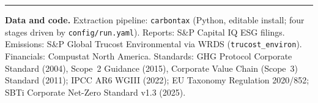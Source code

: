 \documentclass[11pt]{article}
\newcommand{\code}[1]{\texttt{\small #1}}
\begin{document}
\vspace{1em}
\begin{center}
\rule{0.4\textwidth}{0.4pt}
\end{center}
\small
\noindent\textbf{Data and code.} Extraction pipeline: \code{carbontax}
(Python, editable install; four stages driven by \code{config/run.yaml}).
Reports: S\&P Capital IQ ESG filings. Emissions: S\&P Global Trucost
Environmental via WRDS (\code{trucost\_environ}). Financials: Compustat
North America. Standards: GHG Protocol Corporate Standard (2004), Scope~2
Guidance (2015), Corporate Value Chain (Scope~3) Standard (2011); IPCC AR6
WGIII (2022); EU Taxonomy Regulation 2020/852; SBTi Corporate Net-Zero
Standard v1.3 (2025).
\end{document}
